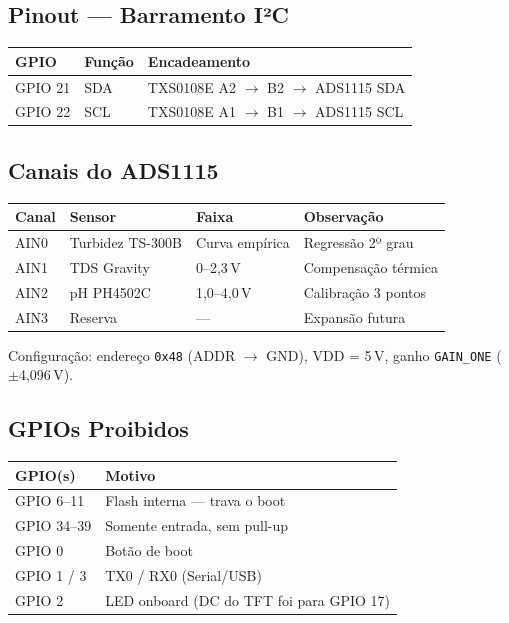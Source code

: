 \documentclass[12pt,a4paper]{article}
\begin{document}
\subsection{Pinout --- Barramento I²C}

\begin{tabularx}{\textwidth}{l l X}
\toprule
\textbf{GPIO} & \textbf{Função} & \textbf{Encadeamento} \\
\midrule
GPIO 21 & SDA & TXS0108E A2 $\rightarrow$ B2 $\rightarrow$ ADS1115 SDA \\
GPIO 22 & SCL & TXS0108E A1 $\rightarrow$ B1 $\rightarrow$ ADS1115 SCL \\
\bottomrule
\end{tabularx}

\subsection{Canais do ADS1115}

\begin{tabularx}{\textwidth}{l l l X}
\toprule
\textbf{Canal} & \textbf{Sensor} & \textbf{Faixa} & \textbf{Observação} \\
\midrule
AIN0 & Turbidez TS-300B & Curva empírica & Regressão 2º grau \\
AIN1 & TDS Gravity & 0--2,3\,V & Compensação térmica \\
AIN2 & pH PH4502C & 1,0--4,0\,V & Calibração 3 pontos \\
AIN3 & Reserva & --- & Expansão futura \\
\bottomrule
\end{tabularx}

Configuração: endereço \texttt{0x48} (ADDR $\rightarrow$ GND), VDD = 5\,V, ganho \texttt{GAIN\_ONE} ($\pm$4,096\,V).

\subsection{GPIOs Proibidos}

\begin{tabularx}{\textwidth}{l X}
\toprule
\textbf{GPIO(s)} & \textbf{Motivo} \\
\midrule
GPIO 6--11 & Flash interna --- trava o boot \\
GPIO 34--39 & Somente entrada, sem pull-up \\
GPIO 0 & Botão de boot \\
GPIO 1 / 3 & TX0 / RX0 (Serial/USB) \\
GPIO 2 & LED onboard (DC do TFT foi para GPIO 17) \\
\bottomrule
\end{tabularx}
\end{document}
